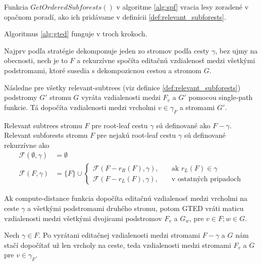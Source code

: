 \begin{pozn}
  Funkcia $Get Ordered Subforests()$ v algoritme \ref{alg:spf} vracia lesy zoradené
  v opačnom poradí, ako ich pridávame v definícii \ref{def:relevant_subforests}.
\end{pozn}

Algoritmus \ref{alg:gted} funguje v troch krokoch.

Najprv podľa stratégie dekomponuje jeden zo stromov podľa cesty $\gamma$,
bez ujmy na obecnosti, nech je to $F$ a rekurzívne spočíta editačnú vzdialenosť
medzi všetkými podstromami, ktoré susedia s dekompozicnou cestou a stromom $G$.

Následne pre všetky relevant-subtrees (viz definice \ref{def:relevant_subforests})
podstromy $G'$ stromu $G$ vyráta vzdialenosti medzi $F_{v}$ a $G'$ pomocou single-path funkcie.
Tá dopočíta vzdialenosti medzi vrcholmi $v \in \gamma_{F}$ a stromami $G'$.

\begin{definice}
  \label{def:relevant_subforests}
	Relevant subtrees stromu $F$ pre root-leaf cestu $\gamma$ sú definované ako $F - \gamma$.
	Relevant subforests stromu $F$ pre nejakú root-leaf cestu $\gamma$ sú definované rekurzívne ako
	\begin{align*}
    \mathcal{F}(\emptyset, \gamma) &= \emptyset
		\\
		\mathcal{F}(F, \gamma) &= \{F\} \cup
		\begin{cases}
      \mathcal{F}(F - r_{R}(F), \gamma), \quad{} &\text{ak $r_{L}(F) \in \gamma$}
			\\
      \mathcal{F}(F - r_{L}(F), \gamma), &\text{v ostatných pripadoch}
		\end{cases}
	\end{align*}
\end{definice}

\begin{lemma}
  Ak compute-distance funkcia dopočíta editačnú vzdialenosť medzi vrcholmi na ceste $\gamma$
  a všetkými podstromami druhého stromu, potom GTED vráti maticu vzdialenosti
  medzi všetkými dvojicami podstromov $F_{v}$ a $G_{w}$, pre $v \in F; w \in G$.
\end{lemma}

\begin{dukaz}
  Nech $\gamma \in F$. Po vyrátani editačnej vzdialenosti medzi stromami
  $F - \gamma$ a $G$ nám stačí dopočítať už len vrcholy na ceste,
  teda vzdialenosti medzi stromami $F_{v}$ a $G$ pre $v \in \gamma_{F}$.
\end{dukaz}

